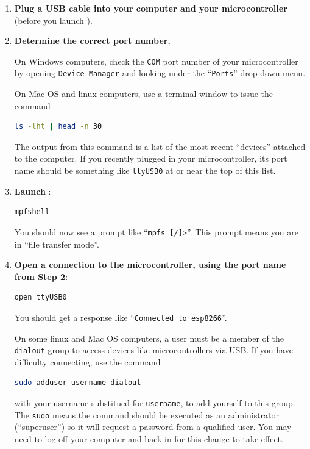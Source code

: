 \begin{enumerate}
\item \textbf{Plug a USB cable into your computer and your microcontroller} (before you launch \mpfshell).
\item \textbf{Determine the correct port number.}

	On Windows computers, check the \texttt{COM} port number of your microcontroller by opening \texttt{Device Manager} and looking under the ``\texttt{Ports}'' drop down menu.

	\smallskip
	On Mac OS and linux computers, use a terminal window to issue the command
\begin{lstlisting}[language=bash]
ls -lht | head -n 30
\end{lstlisting}
	The output from this command is a list of the most recent ``devices'' attached to the computer.
	If you recently plugged in your microcontroller, its port name should be something like \texttt{ttyUSB0} at or near the top of this list.
	\item \textbf{Launch \mpfshell}:
\begin{lstlisting}[language=bash]
mpfshell
\end{lstlisting}
	You should now see a prompt like ``\verb|mpfs [/]>|''.
	This prompt means you are in ``file transfer mode''.
	\item \textbf{Open a connection to the microcontroller, using the port name from Step 2}:
\begin{lstlisting}[language=bash]
open ttyUSB0
\end{lstlisting}
	You should get a response like ``\texttt{Connected to esp8266}''.

	\smallskip
	On some linux and Mac OS computers, a user must be a member of the \texttt{dialout} group to access devices like microcontrollers via USB.
	If you have difficulty connecting, use the command
\begin{lstlisting}[language=bash]
sudo adduser username dialout
\end{lstlisting}
	with your username substitued for \texttt{username}, to add yourself to this group.
	The \texttt{sudo} means the command should be executed as an administrator (``superuser'') so it will request a password from a qualified user.
	You may need to log off your computer and back in for this change to take effect.


\end{enumerate}
